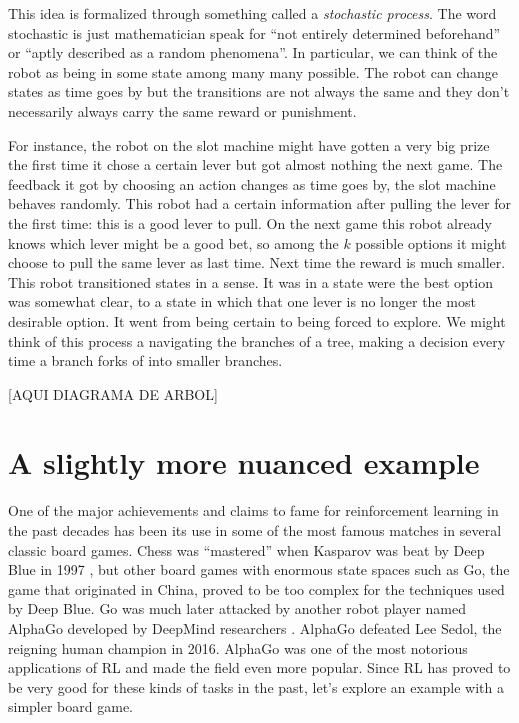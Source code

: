 This idea is formalized through something called a 
\textit{stochastic process}. The word stochastic is just 
mathematician speak for ``not entirely determined beforehand'' 
or ``aptly described as a random phenomena''.  In particular, we 
can think of the robot as being in some state among many many 
possible. The robot can change states as time goes by but the 
transitions are not always the same and they don't necessarily 
always carry the same reward or punishment.

For instance, the robot on the slot machine might have gotten a 
very big prize the first time it chose a certain lever but got 
almost nothing the next game. The feedback it got by choosing an 
action changes as time goes by, the slot machine behaves 
randomly. This robot had a certain information after pulling the 
lever for the first time: this is a good lever to pull. On the 
next game this robot already knows which lever might be a good 
bet, so among the $k$ possible options it might choose to pull 
the same lever as last time. Next time the reward is much 
smaller. This robot transitioned states in a sense. It was in a 
state were the best option was somewhat clear, to a state in 
which that one lever is no longer the most desirable option. It 
went from being certain to being forced to explore. We might 
think of this process a navigating the branches of a tree, 
making a decision every time a branch forks of into smaller 
branches.

[AQUI DIAGRAMA DE ARBOL]

\section{A slightly more nuanced example}
One of the major achievements and claims to fame for 
reinforcement learning in the past decades has been its use in 
some of the most famous matches in several classic board games.  Chess was 
``mastered'' when Kasparov was beat by Deep Blue in 1997 
\cite{silverchess}, but other board games with enormous state 
spaces such as Go, the game that originated in China, proved to 
be too complex for the techniques used by Deep Blue. Go was much 
later attacked by another robot player named AlphaGo developed 
by DeepMind researchers \cite{silver2017mastering}.  AlphaGo 
defeated Lee Sedol, the reigning human champion in 2016.  
AlphaGo was one of the most notorious applications of RL and 
made the field even more popular. Since RL has proved to be very 
good for these kinds of tasks in the past, let's explore an 
example with a simpler board game.

